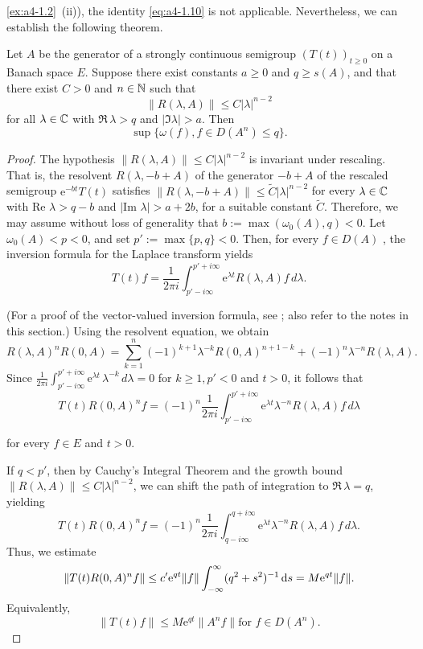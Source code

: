 \ref{ex:a4-1.2}~(ii)), the identity \eqref{eq:a4-1.10} is not applicable. 
Nevertheless, we can establish the following theorem.
\begin{theorem}\label{thm:a4-1.9} 
Let $A$ be the generator of a strongly continuous semigroup $(T(t))_{t \geq 0}$ on a Banach space $E$. 
Suppose there exist constants $a \geq 0$ and $q \geq s(A)$, and that there exist $C > 0$ and $n \in \mathbb{N}$ such that 
\[
    \| R(\lambda, A) \| \leq C | \lambda |^{n-2}
\]
for all $\lambda \in \mathbb{C}$ with $\Re\,\lambda > q$ and $| \Im \lambda | > a$. 
Then
\[
    \sup \{ \omega(f),  f \in D(A^n)  \leq q\}.
\]
\end{theorem}
\begin{proof} 
The hypothesis $\| R(\lambda, A) \| \leq C | \lambda |^{n-2}$ is invariant under rescaling. 
That is, the resolvent $R(\lambda, -b+A)$ of the generator $-b+A$ of the rescaled semigroup $\mathrm{e}^{-bt} T(t)$ satisfies
$\| R(\lambda, -b+A) \| \leq \tilde{C} | \lambda |^{n-2}$ for every $\lambda \in \mathbb{C}$ with $\text{Re } \lambda > q-b$ and $| \text{Im } \lambda | > a+2b$, for a suitable constant $\tilde{C}$. 
Therefore, we may assume without loss of generality that $b := \max(\omega_{0}(A), q) < 0$. 
Let $\omega_{0}(A) < p < 0$, and set $p' := \max\{p, q\} < 0$. 
Then, for every $f \in D(A)$ , the inversion formula for the Laplace transform yields 
\begin{equation} \label{eq:a4-1.12}
T(t) f = \frac{1}{2\pi i} \int_{p' - i\infty}^{p' + i\infty} \mathrm{e}^{\lambda t} R(\lambda, A) f \, d\lambda.
\end{equation}

 (For a proof of the vector-valued inversion formula, see \citet[p.66]{widder:1946}; also refer to the notes in this section.)
Using the resolvent equation, we obtain 
\[ 
R(\lambda, A)^n R(0, A) = \sum_{k=1}^{n} (-1)^{k+1} \lambda^{-k} R(0, A)^{n+1-k} + (-1)^n \lambda^{-n} R(\lambda, A).
\]
Since 
$ \frac {1}{2\pi i} \int_{p' - i\infty}^{p' + i\infty} \mathrm{e}^{\lambda t} \, \lambda^{-k} \, d\lambda = 0 $ for $ k \geq 1, p' < 0 $ and $ t > 0$, it follows that
 \begin{equation}\label{eq:a4-1.13}
   T(t) R(0, A)^n f = (-1)^n \frac{1}{2\pi i} \int_{p' - i\infty}^{p' + i\infty} \mathrm{e}^{\lambda t} \lambda^{-n} R(\lambda, A) f \, d\lambda
    \end{equation}
    
 for every $f \in E$ and $t > 0$.
    
 If $q < p'$, then by Cauchy's Integral Theorem and the growth bound $\| R(\lambda, A) \| \leq C | \lambda |^{n-2}$, we can shift the path of integration to 
 $\Re \, \lambda = q$, yielding
\[
    T(t) R(0, A)^n f = (-1)^n \frac{1}{2\pi i} \int_{q - i\infty}^{q + i\infty} \mathrm{e}^{\lambda t} \lambda^{-n} R(\lambda, A) f \, d\lambda.
\]
Thus, we estimate  
\[
\| T(t) R(0,A)^n f \| \leq c' \mathrm{e}^{q t} \| f \| \int_{-\infty}^{\infty} (q^2 + s^2)^{-1}\mathop{}\!\mathrm{d}{s} = M \mathrm{e}^{q t} \| f \|.
\]
Equivalently,
\[
\| T(t) f \| \leq M \mathrm{e}^{q t} \| A^n f \| \text{for $f \in D(A^n)$.}
\]
\end{proof}

